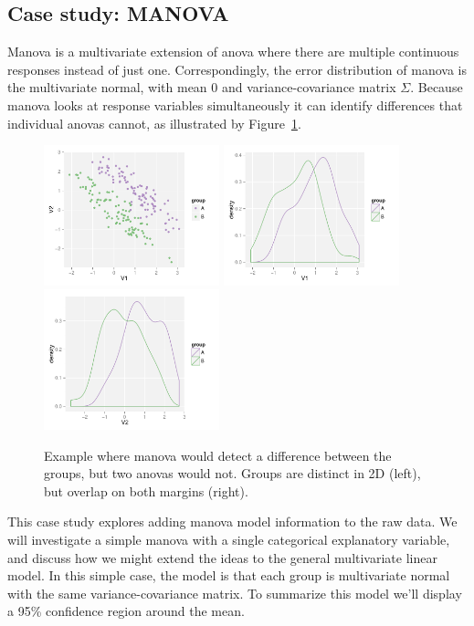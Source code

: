 \documentclass[preprint]{imsart}
\begin{document}
\subsection{Case study: MANOVA}
\label{sub:manova}

{\sc Manova} is a multivariate extension of {\sc anova} where there are multiple continuous responses instead of just one.  Correspondingly, the error distribution of {\sc manova} is the multivariate normal, with mean 0 and variance-covariance matrix $\Sigma$. Because {\sc manova} looks at response variables simultaneously it can identify differences that individual {\sc anova}s cannot, as illustrated by Figure~\ref{fig:manova-ex}.

\begin{figure}[htb]
  \centering
    \includegraphics[width=2in]{manova-example}
    \includegraphics[width=2in]{manova-example-m1}
    \includegraphics[width=2in]{manova-example-m2}
  \caption{Example where {\sc manova} would detect a difference between the groups, but two {\sc anova}s would not.  Groups are distinct in 2D (left), but overlap on both margins (right).}
  \label{fig:manova-ex}
\end{figure}

This case study explores adding {\sc manova} model information to the raw data. We will investigate a simple {\sc manova} with a single categorical explanatory variable, and discuss how we might extend the ideas to the general multivariate linear model. In this simple case, the model is that each group is multivariate normal with the same variance-covariance matrix. To summarize this model we'll display a 95\% confidence region around the mean.
\end{document}

